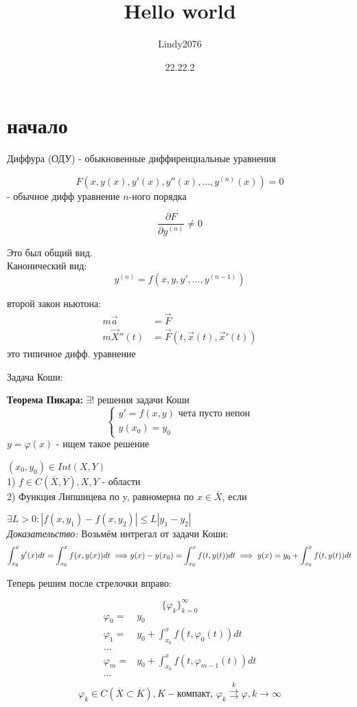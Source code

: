 \documentclass[12pt, a4paper]{article}
\title{Hello world}
\author{Lindy2076}
\date{22.22.2} %
\begin{document}
\section{начало}

	Диффура (ОДУ) - обыкновенные диффиренциальные уравнения
	
	$$F(x, y(x), y'(x), y''(x), \dotsc, y^{(n)}(x)) = 0$$ - обычное дифф уравнение $n$-ного порядка
	
	$$\frac{\partial F}{\partial y^{(n)}} \neq 0$$

Это был общий вид.\\
Канонический вид:
$$y^{(n)} = f(x,y,y',\dotsc,y^{(n-1)})$$

второй закон ньютона: 
\begin{align}
m\vec{a} &= \vec{F} \\
m\vec{X}''(t) &= \vec{F}(t, \vec{x}(t), \vec{x}'(t))
\end{align}
это типичное дифф. уравнение

Задача Коши:



\textbf{Теорема Пикара:} $\exists!$ решения задачи Коши
$$\begin{cases}
	y' = f(x,y) \text{ чета пусто непон}\\
	y(x_0) = y_0
\end{cases}$$
$ y = \varphi(x)$ - ищем такое решение 

$(x_0, y_0) \in Int(X, Y)$\\
1) $f \in C(\overline{X}, \overline{Y}), X, Y$ - области \\
2) Функция Липшицева по y, равномерна по $x \in \overline{X}$, если

$\exists L>0: | f(x,y_1) - f(x,y_2)| \le L |y_1-y_2|$\\

\textit{Доказательство:}
Возьмём интрегал от задачи Коши:
$$\int^{x}_{x_0} y'(x) dt = \int^{x}_{x_0} f(x, y(x))dt \implies \\ y(x)-y(x_0) = \int^x_{x_0} f(t, y(t))dt \implies y(x) = y_0 + \int^x_{x_0}f(t,y(t))dt$$

Теперь решим после стрелочки вправо:

$$\{\varphi_k\}^\infty_{k=0}$$
$$
\begin{align}
\varphi_0 =& y_0 \\
\varphi_1 =& y_0 + \int^x_{x_0}f(t, \varphi_0(t))dt \\
\dotsc \\
\varphi_m =& y_0 + \int^x_{x_0}f(t, \varphi_{m-1}(t))dt \\
\dotsc \\
\end{align}$$
$$ \varphi_k \in C({\overline X \subset \overline K}), K - \text{компакт, } \varphi_k \overset{k}{\rightrightarrows } \varphi, k\to\infty
$$
\end{document}
